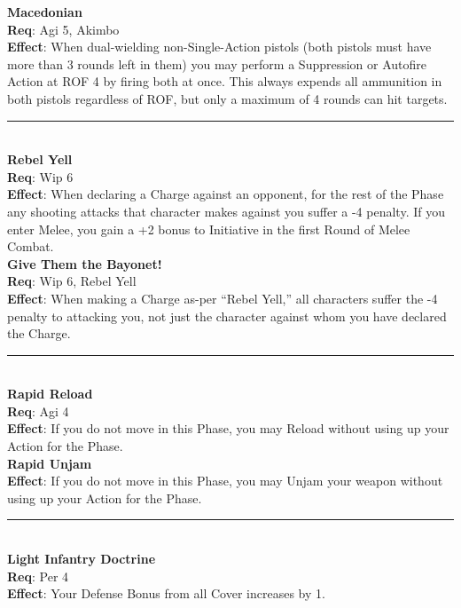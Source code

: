 \documentclass[a4paper, twocolumn, openany]{book}
\newlength{\indentlen}
\newcommand{\tabto}[1]{\setlength{\leftskip}{#1\indentlen}}
\begin{document}
{	\tabto{1}
	{\bfseries Macedonian}\\
	{\bfseries Req}:  Agi 5, Akimbo\\
	{\bfseries Effect}: When dual-wielding non-Single-Action pistols (both pistols must have more than
	3 rounds left in them) you may perform a Suppression or Autofire Action at ROF 4 by
	firing both at once. This always expends all ammunition in both pistols regardless of
	ROF, but only a maximum of 4 rounds can hit targets.\\ \hrule\ \\

\tabto{0} %
{\bfseries Rebel Yell}\\
{\bfseries Req}: Wip 6\\
{\bfseries Effect}: When declaring a Charge against an opponent, for the rest of the Phase any shooting
attacks that character makes against you suffer a -4 penalty. If you enter Melee, you gain a +2
bonus to Initiative in the first Round of Melee Combat.\\

	\tabto{1}
	{\bfseries Give Them the Bayonet!}\\
	{\bfseries Req}: Wip 6, Rebel Yell\\
	{\bfseries Effect}: When making a Charge as-per “Rebel Yell,” all characters suffer the -4 penalty to
	attacking you, not just the character against whom you have declared the Charge.\\ \hrule\ \\

\tabto{0} %
{\bfseries Rapid Reload}\\
{\bfseries Req}: Agi 4\\
{\bfseries Effect}: If you do not move in this Phase, you may Reload without using up your Action for the
Phase.\\

	\tabto{1}
	{\bfseries Rapid Unjam}\\
	{\bfseries Effect}: If you do not move in this Phase, you may Unjam your weapon without using up
	your Action for the Phase.\\ \hrule\ \\

\tabto{0}
{\bfseries Light Infantry Doctrine}\\ 
{\bfseries Req}: Per 4\\
{\bfseries Effect}: Your Defense Bonus from all Cover increases by 1.\\

}
\end{document}
